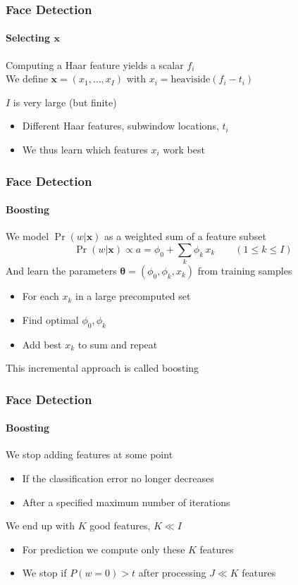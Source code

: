 \documentclass[xetex,professionalfont]{beamer}
\renewcommand{\vec}[1]{\ensuremath{\mathbf{#1}}}
\newcommand{\vx}{\vec{x}}
\newcommand{\bth}{\boldsymbol{\theta}}
\renewcommand\emph[1]{\textcolor{tuwcvl_inf_red}{#1}}
\begin{document}

\begin{frame}
\frametitle{Face Detection}
\framesubtitle{Selecting $\vx$}

Computing a Haar feature yields a scalar $f_i$ \\
We define $\vx=(x_1,\dots,x_I)$ with $x_i=\text{heaviside}(f_i-t_i)$ %

\bigskip
$I$ is very large (but finite)
\begin{itemize}
    \item Different Haar features, subwindow locations, $t_i$
    \item We thus learn which features $x_i$ work best
\end{itemize}

\end{frame}


\begin{frame}
\frametitle{Face Detection}
\framesubtitle{Boosting}

We model $\Pr(w|\vx)$ as a weighted sum of a feature subset
\[
    \Pr(w|\vx) \propto a = \phi_0+\sum_k \phi_k\, x_k \qquad (1\leq k\leq I)
\]
And learn the parameters $\bth=(\phi_0,\phi_k,x_k)$ from training samples
\begin{itemize}
    \item For each $x_k$ in a large precomputed set
    \item Find optimal $\phi_0,\phi_k$
    \item Add best $x_k$ to sum and repeat
\end{itemize}

\bigskip
This incremental approach is called \emph{boosting}

\end{frame}


\begin{frame}
\frametitle{Face Detection}
\framesubtitle{Boosting}

We stop adding features at some point
\begin{itemize}
    \item If the classification error no longer decreases
    \item After a specified maximum number of iterations
\end{itemize}

\bigskip
We end up with $K$ good features, $K\ll I$
\begin{itemize}
    \item For prediction we compute only these $K$ features
    \item We stop if $P(w=0)>t$ after processing $J\ll K$ features %
\end{itemize}

\end{frame}
\end{document}
